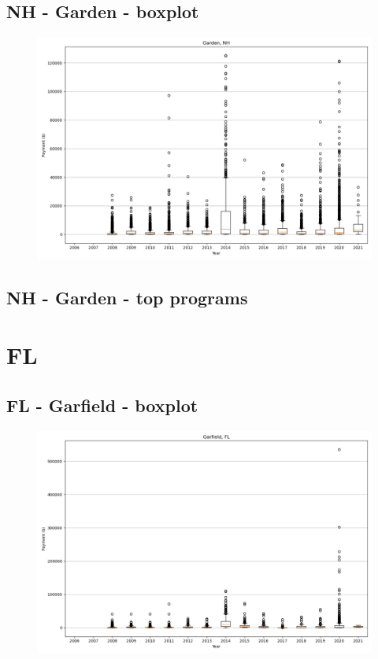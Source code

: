 \subsection*{NH - Garden - boxplot}
\begin{figure}[h]
\centering
\includegraphics[width=7in]{../output/boxplots/counties/Garden-NH_boxplot.png}
\end{figure}


\subsection*{NH - Garden - top programs}

\newpage
\section*{FL}
\subsection*{FL - Garfield - boxplot}
\begin{figure}[h]
\centering
\includegraphics[width=7in]{../output/boxplots/counties/Garfield-FL_boxplot.png}
\end{figure}


